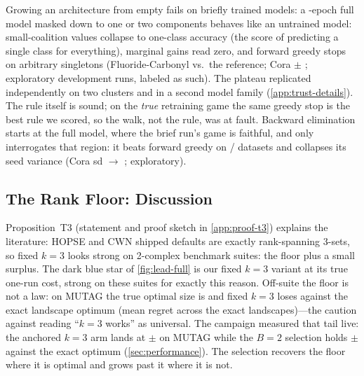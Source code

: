 Growing an architecture from empty fails on briefly trained models: a
\unfrozen{\ResStemEpochs}-epoch full model masked down to one or
two components behaves like an untrained model: small-coalition
values collapse to one-class accuracy (the score of predicting a
single class for everything), marginal gains read zero, and forward
greedy stops on arbitrary singletons (Fluoride-Carbonyl
\unfrozen{\ResForwardFluoride} vs.\ the
\unfrozen{\ResForwardFluorideRef} reference; Cora
\unfrozen{\ResForwardCoraMean} $\pm$ \unfrozen{\ResForwardCoraSd};
exploratory development runs, labeled as such). The plateau replicated
independently on two clusters and in a second model family
(\cref{app:trust-details}). The rule itself is sound; on the
\emph{true} retraining game the same greedy stop is the best rule we
scored, so the walk, not the rule, was at fault. Backward elimination
starts at the full model, where the brief run's game is faithful, and only
interrogates that region: it beats forward greedy on
\unfrozen{\ResBackwardBeatsForwardWins}/\unfrozen{\ResBackwardBeatsForwardTotal}
datasets and collapses its seed variance (Cora sd
\unfrozen{\ResForwardCoraSd} $\to$ \unfrozen{\ResBackwardCoraSd};
exploratory).

\subsection{The Rank Floor: Discussion}
\label{app:selection-rankfloor}

Proposition~T3 (statement and proof sketch in \cref{app:proof-t3})
explains the literature: HOPSE and CWN shipped defaults are exactly
rank-spanning 3-sets, so fixed $k=3$ looks strong on 2-complex
benchmark suites: the floor plus a small surplus. The dark blue star
of \cref{fig:lead-full} is our fixed $k=3$ variant at its true one-run
cost, strong on these suites for exactly this reason. Off-suite the
floor is not a law: on MUTAG the true optimal size is
\unfrozen{\ResMutagTrueKStar} and fixed $k=3$ loses
\unfrozen{\ResFixedKMutagRegret} against the exact landscape optimum
(mean regret \unfrozen{\ResFixedKMeanRegret} across the
\unfrozen{\ResLadderAllTotal} exact landscapes)---the caution against
reading ``$k=3$ works'' as universal. The campaign measured that tail
live: the anchored $k{=}3$ arm lands at
\unfrozen{\ResMutagFixedKLiveAcc} $\pm$
\unfrozen{\ResMutagFixedKLiveSd} on MUTAG while the $B{=}2$ selection
holds \unfrozen{\ResMutagLadderBTwoAcc} $\pm$
\unfrozen{\ResMutagLadderBTwoSd} against the exact optimum
\unfrozen{\ResMutagExactOpt} (\cref{sec:performance}). The selection
recovers the floor where it is optimal and grows past it where it is
not.

